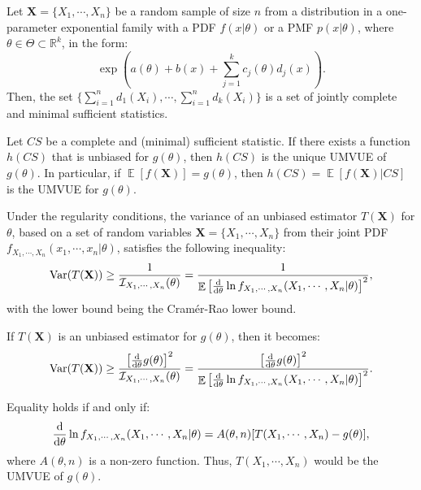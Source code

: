 \documentclass{huhtakm-template-book-v2}
\DeclareMathOperator{\E}{\mathbb{E}}
\DeclareMathOperator{\Var}{Var}
\begin{document}
    \begin{thm}
        Let $\mathbf{X}=\{X_{1},\cdots,X_{n}\}$ be a random sample of size $n$ from a distribution in a one-parameter exponential family with a PDF $f(x|\theta)$ or a PMF $p(x|\theta)$, where $\theta\in\Theta\subset\mathbb{R}^{k}$, in the form:
        \begin{equation*}
            \exp\left(a(\theta)+b(x)+\sum_{j=1}^{k}c_{j}(\theta)d_{j}(x)\right).
        \end{equation*}
        Then, the set $\{\sum_{i=1}^{n}d_{1}(X_{i}),\cdots,\sum_{i=1}^{n}d_{k}(X_{i})\}$ is a set of jointly complete and minimal sufficient statistics.
    \end{thm}
    \begin{thm}
        Let $CS$ be a complete and (minimal) sufficient statistic. If there exists a function $h(CS)$ that is unbiased for $g(\theta)$, then $h(CS)$ is the unique UMVUE of $g(\theta)$. In particular, if $\E[f(\mathbf{X})]=g(\theta)$, then $h(CS)=\E[f(\mathbf{X})|CS]$ is the UMVUE for $g(\theta)$.
    \end{thm}
    \begin{thm}
        Under the regularity conditions, the variance of an unbiased estimator $T(\mathbf{X})$ for $\theta$, based on a set of random variables $\mathbf{X}=\{X_{1},\cdots,X_{n}\}$ from their joint PDF $f_{X_{1},\cdots,X_{n}}(x_{1},\cdots,x_{n}|\theta)$, satisfies the following inequality:
        \begin{equation*}
            \Var(T(\mathbf{X}))\geq\frac{1}{\mathcal{I}_{X_{1},\cdots,X_{n}}(\theta)}=\frac{1}{\E\left[\odv*{\ln{f_{X_{1},\cdots,X_{n}}(X_{1},\cdots,X_{n}|\theta)}}{\theta}\right]^{2}},
        \end{equation*}
        with the lower bound being the Cram\'er-Rao lower bound.
        
        If $T(\mathbf{X})$ is an unbiased estimator for $g(\theta)$, then it becomes:
        \begin{equation*}
            \Var(T(\mathbf{X}))\geq\frac{\left[\odv*{g(\theta)}{\theta}\right]^{2}}{\mathcal{I}_{X_{1},\cdots,X_{n}}(\theta)}=\frac{\left[\odv*{g(\theta)}{\theta}\right]^{2}}{\E\left[\odv*{\ln{f_{X_{1},\cdots,X_{n}}(X_{1},\cdots,X_{n}|\theta)}}{\theta}\right]^{2}}.
        \end{equation*}
        
        Equality holds if and only if:
        \begin{equation*}
            \odv*{\ln{f_{X_{1},\cdots,X_{n}}(X_{1},\cdots,X_{n}|\theta)}}{\theta}=A(\theta,n)[T(X_{1},\cdots,X_{n})-g(\theta)],
        \end{equation*}
        where $A(\theta,n)$ is a non-zero function. Thus, $T(X_{1},\cdots,X_{n})$ would be the UMVUE of $g(\theta)$.
    \end{thm}
\end{document}
